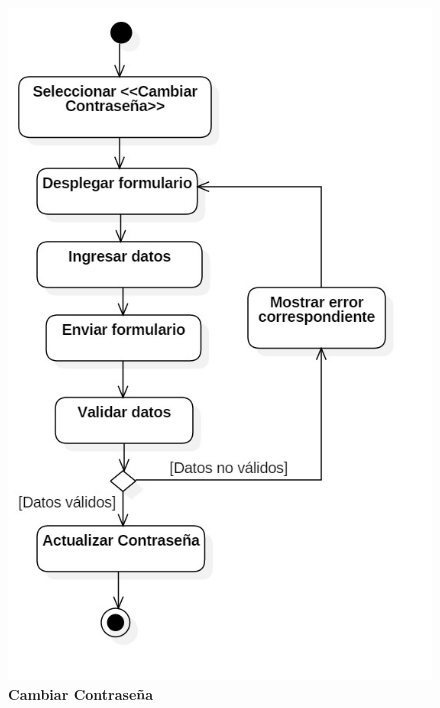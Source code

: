 \begin{figure}[H]
  \centering
    \includegraphics[scale=.65,angle=0]{project/Actividades/A_cambiar_contrasena.jpg}
  \caption{\textbf{Cambiar Contraseña}}
\end{figure}
